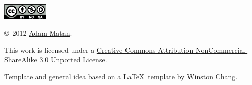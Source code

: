 \documentclass[10pt,landscape]{article}
\begin{document}
\begin{multicols}{3}
\begin{scriptsize}
\includegraphics[width=6em]{by_nc_sa.eps} {\copyright\ 2012 \href{http://matan.name}{Adam Matan}. 

This work is licensed under a \href{http://creativecommons.org/licenses/by-nc-sa/3.0/}{Creative Commons Attribution-NonCommercial-ShareAlike 3.0 Unported License}.}

Template and general idea based on a \href{http://www.stdout.org/~winston/latex/}{\LaTeX\ template by Winston Chang}.
\end{scriptsize}




\end{multicols}
\end{document}
